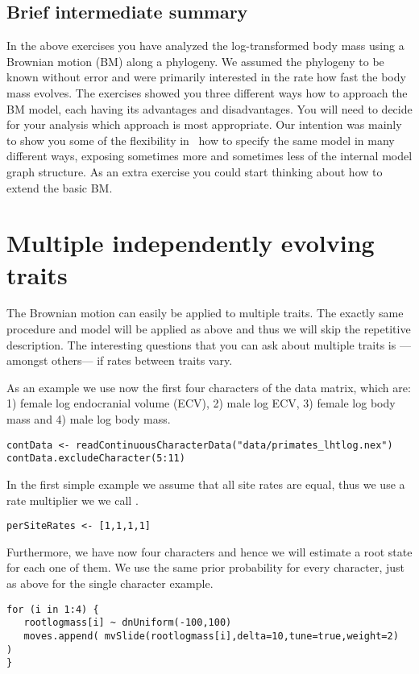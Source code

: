 \subsection{Brief intermediate summary}
In the above exercises you have analyzed the log-transformed body mass using a Brownian motion (BM) along a phylogeny. We assumed the phylogeny to be known without error and were primarily interested in the rate how fast the body mass evolves. The exercises showed you three different ways how to approach the BM model, each having its advantages and disadvantages. You will need to decide for your analysis which approach is most appropriate. Our intention was mainly to show you some of the flexibility in \RevBayes~how to specify the same model in many different ways, exposing sometimes more and sometimes less of the internal model graph structure. As an extra exercise you could start thinking about how to extend the basic BM.



\vspace{5cm}


\section{Multiple independently evolving traits}
The Brownian motion can easily be applied to multiple traits. The exactly same procedure and model will be applied as above and thus we will skip the repetitive description. The interesting questions that you can ask about multiple traits is ---amongst others--- if rates between traits vary.


As an example we use now the first four characters of the data matrix, which are: 1) female log endocranial volume (ECV), 2) male log ECV, 3) female log body mass and 4) male log body mass.
{\tt \small \begin{snugshade*}
\begin{lstlisting}
contData <- readContinuousCharacterData("data/primates_lhtlog.nex")
contData.excludeCharacter(5:11)
\end{lstlisting}
\end{snugshade*}}
In the first simple example we assume that all site rates are equal, thus we use a rate multiplier we we call .
{\tt \small \begin{snugshade*}
\begin{lstlisting}
perSiteRates <- [1,1,1,1]
\end{lstlisting}
\end{snugshade*}}
Furthermore, we have now four characters and hence we will estimate a root state for each one of them. We use the same prior probability for every character, just as above for the single character example.
{\tt \small \begin{snugshade*}
\begin{lstlisting}
for (i in 1:4) {
   rootlogmass[i] ~ dnUniform(-100,100)
   moves.append( mvSlide(rootlogmass[i],delta=10,tune=true,weight=2)  )
}
\end{lstlisting}
\end{snugshade*}}

